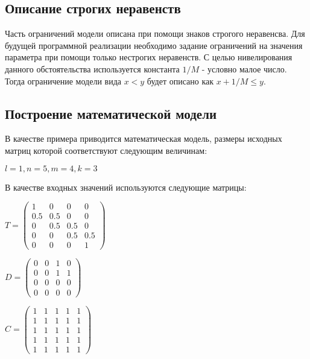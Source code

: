 \subsection*{Описание строгих неравенств}
Часть ограничений модели описана при помощи знаков строгого неравенсва. Для будущей программной реализации необходимо задание ограничений на значения параметра при помощи только нестрогих неравенств. С целью нивелирования данного обстоятельства используется константа $1 / M$ - условно малое число. Тогда ограничение модели вида $x < y$ будет описано как $x + 1 / M \le y$.

\subsection*{Построение математической модели}
В качестве примера приводится математическая модель, размеры исходных матриц которой соответствуют следующим величинам:
\begin{center}
  $l = 1, n = 5, m = 4, k = 3$
\end{center}

В качестве входных значений используются следующие матрицы:
\begin{center}
  $
  T = 
  \begin{pmatrix}
      1 &   0 &   0 & 0   \\
    0.5 & 0.5 &   0 & 0   \\
      0 & 0.5 & 0.5 & 0   \\
      0 &   0 & 0.5 & 0.5 \\
      0 &   0 &   0 & 1 
  \end{pmatrix}
  $
\end{center}

\begin{center}
  $
  D = 
  \begin{pmatrix}
    0 & 0 & 1 & 0   \\
    0 & 0 & 1 & 1   \\
    0 & 0 & 0 & 0   \\
    0 & 0 & 0 & 0 
  \end{pmatrix}
  $
\end{center}

\begin{center}
  $
  C = 
  \begin{pmatrix}
    1 & 1 & 1 & 1 & 1   \\
    1 & 1 & 1 & 1 & 1   \\
    1 & 1 & 1 & 1 & 1   \\
    1 & 1 & 1 & 1 & 1   \\
    1 & 1 & 1 & 1 & 1 
  \end{pmatrix}
  $
\end{center}

